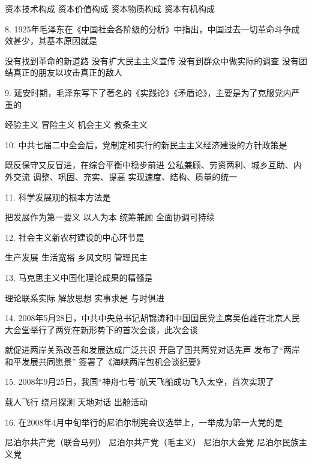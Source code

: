 \begin{choices}
	 资本技术构成
	 资本价值构成
	 资本物质构成
	 资本有机构成
\end{choices}
8. 1925年毛泽东在《中国社会各阶级的分析》中指出，中国过去一切革命斗争成效甚少，其基本原因就是
\begin{choices}
	 没有找到革命的新道路
	 没有扩大民主主义宣传
	 没有到群众中做实际的调查
	 没有团结真正的朋友以攻击真正的敌人
\end{choices}
9. 延安时期，毛泽东写下了著名的《实践论》《矛盾论》，主要是为了克服党内严重的
\begin{choices}
	 经验主义
	 冒险主义
	 机会主义
	 教条主义
\end{choices}
10. 中共七届二中全会后，党制定和实行的新民主主义经济建设的方针政策是
\begin{choices}
	 既反保守又反冒进，在综合平衡中稳步前进
	 公私兼顾、劳资两利、城乡互助、内外交流
	 调整、巩固、充实、提高
	 实现速度、结构、质量的统一
\end{choices}
11. 科学发展观的根本方法是
\begin{choices}
	 把发展作为第一要义
	 以人为本
	 统筹兼顾
	 全面协调可持续
\end{choices}
12. 社会主义新农村建设的中心环节是
\begin{choices}
	 生产发展
	 生活宽裕
	 乡风文明
	 管理民主
\end{choices}
13. 马克思主义中国化理论成果的精髓是
\begin{choices}
	 理论联系实际
	 解放思想
	 实事求是
	 与时俱进
\end{choices}
14. 2008年5月28日，中共中央总书记胡锦涛和中国国民党主席吴伯雄在北京人民大会堂举行了两党在新形势下的首次会谈，此次会谈
\begin{choices}
	 就促进两岸关系改善和发展达成广泛共识
	 开启了国共两党对话先声
	 发布了“两岸和平发展共同愿景”
	 签署了《海峡两岸包机会谈纪要》
\end{choices}
15. 2008年9月25日，我国“神舟七号”航天飞船成功飞入太空，首次实现了
\begin{choices}
	 载人飞行
	 绕月探测
	 天地对话
	 出舱活动
\end{choices}
16. 在2008年4月中旬举行的尼泊尔制宪会议选举上，一举成为第一大党的是
\begin{choices}
	 尼泊尔共产党（联合马列）
	 尼泊尔共产党（毛主义）
	 尼泊尔大会党
	 尼泊尔民族主义党
\end{choices}
\vspace{6pt}

